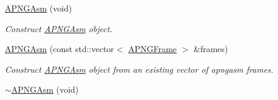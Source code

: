 \begin{DoxyCompactItemize}
\item 
\hypertarget{classapngasm_1_1APNGAsm_a8e20443aff7eab2a51b9140d97168da2}{\hyperlink{classapngasm_1_1APNGAsm_a8e20443aff7eab2a51b9140d97168da2}{A\-P\-N\-G\-Asm} (void)}\label{classapngasm_1_1APNGAsm_a8e20443aff7eab2a51b9140d97168da2}

\begin{DoxyCompactList}\small\item\em Construct \hyperlink{classapngasm_1_1APNGAsm}{A\-P\-N\-G\-Asm} object. \end{DoxyCompactList}\item 
\hyperlink{classapngasm_1_1APNGAsm_a4f8cc13561379ed9fdf7cbe132e1e496}{A\-P\-N\-G\-Asm} (const std\-::vector$<$ \hyperlink{classapngasm_1_1APNGFrame}{A\-P\-N\-G\-Frame} $>$ \&frames)
\begin{DoxyCompactList}\small\item\em Construct \hyperlink{classapngasm_1_1APNGAsm}{A\-P\-N\-G\-Asm} object from an existing vector of apngasm frames. \end{DoxyCompactList}\item 
\hypertarget{classapngasm_1_1APNGAsm_a63670f5cc79de98738c28c303cc74f37}{\hyperlink{classapngasm_1_1APNGAsm_a63670f5cc79de98738c28c303cc74f37}{$\sim$\-A\-P\-N\-G\-Asm} (void)}\label{classapngasm_1_1APNGAsm_a63670f5cc79de98738c28c303cc74f37}


\end{DoxyCompactItemize}
